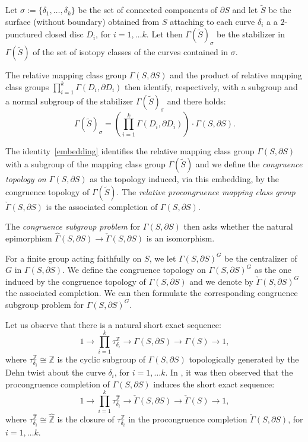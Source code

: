 \documentclass[12pt,twoside]{amsart}
\theoremstyle{definition}
\newcommand{\Z}{\mathbb{Z}}
\newcommand{\ZZ}{{\widehat{\mathbb Z}}}
\def\tS{\widetilde{S}}
\def\dd{\partial}
\def\G{{\Gamma}}
\def\kG{{\check\Gamma}}
\def\hG{{\widehat\Gamma}}
\def\d{{\delta}}
\def\s{{\sigma}}
\begin{document}
Let $\s:=\{\delta_1,\ldots,\delta_k\}$ be the set of connected components of $\dd S$ and let $\tS$ be the surface (without boundary) 
obtained from $S$ attaching to each curve $\delta_i$ a  a $2$-punctured closed disc $D_i$, for $i=1,\dots k$. Let then $\G(\tS)_\s$ 
be the stabilizer in $\G(\tS)$ of the set of isotopy classes of the curves contained in $\s$. 

The relative mapping class group $\G(S,\dd S)$ and the product of relative mapping class groups $\prod_{i=1}^k\G(D_i,\dd D_i)$ then identify,
respectively, with a subgroup and a normal subgroup of the stabilizer $\G(\tS)_\s$ and there holds:
\begin{equation}\label{embedding}
\G(\tS)_\s=(\prod_{i=1}^k\G(D_i,\dd D_i))\cdot\G(S,\dd S).
\end{equation}

The identity~\eqref{embedding} identifies the relative mapping class group $\G(S,\dd S)$ with a subgroup of the mapping class group $\G(\tS)$ and we
define the \emph{congruence topology on $\G(S,\dd S)$} as the topology induced, via this embedding, by the congruence topology of $\G(\tS)$. 
The \emph{relative procongruence mapping class group} $\kG(S,\dd S)$ is the associated completion of $\G(S,\dd S)$.

The \emph{congruence subgroup problem} for $\G(S,\dd S)$ then asks whether the natural epimorphism $\hG(S,\dd S)\to\kG(S,\dd S)$ is an isomorphism. 

For a finite group acting faithfully on $S$, we let $\G(S,\dd S)^G$ be the centralizer of $G$ in $\G(S,\dd S)$. We define the congruence
topology on $\G(S,\dd S)^G$ as the one induced by the congruence topology of $\G(S,\dd S)$ and we denote by $\kG(S,\dd S)^G$ the
associated completion. We can then formulate the corresponding congruence subgroup problem for $\G(S,\dd S)^G$.

Let us observe that there is a natural short exact sequence:
\begin{equation}\label{relexseq1}
1\to\prod_{i=1}^k\tau_{\d_i}^\Z\to\G(S,\dd S)\to\G(S)\to 1,
\end{equation}
where $\tau_{\d_i}^\Z\cong\Z$ is the cyclic subgroup of $\G(S,\dd S)$ topologically generated by the Dehn twist about the curve $\d_i$, for $i=1,\dots k$.
In \cite[Section~2.7]{Aut}, it was then observed that the procongruence completion of $\G(S,\dd S)$ induces the short exact sequence:
\begin{equation}\label{relexseq2}
1\to\prod_{i=1}^k\tau_{\d_i}^\ZZ\to\kG(S,\dd S)\to\kG(S)\to 1,
\end{equation}
where $\tau_{\d_i}^\ZZ\cong\ZZ$ is the closure of $\tau_{\d_i}^\Z$ in the procongruence completion $\kG(S,\dd S)$, for $i=1,\dots k$. 
\end{document}

